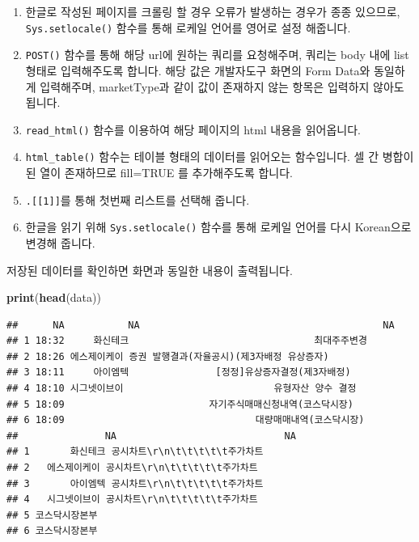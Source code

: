 \documentclass[]{book}
\newenvironment{Shaded}{\begin{snugshade}}{\end{snugshade}}
\newcommand{\KeywordTok}[1]{\textcolor[rgb]{0.13,0.29,0.53}{\textbf{#1}}}
\newcommand{\NormalTok}[1]{#1}
\providecommand{\tightlist}{%
  \setlength{\itemsep}{0pt}\setlength{\parskip}{0pt}}
\begin{document}
\begin{enumerate}
\def\labelenumi{\arabic{enumi}.}
\tightlist
\item
  한글로 작성된 페이지를 크롤링 할 경우 오류가 발생하는 경우가 종종 있으므로, \texttt{Sys.setlocale()} 함수를 통해 로케일 언어를 영어로 설정 해줍니다.
\item
  \texttt{POST()} 함수를 통해 해당 url에 원하는 쿼리를 요청해주며, 쿼리는 body 내에 list 형태로 입력해주도록 합니다. 해당 값은 개발자도구 화면의 Form Data와 동일하게 입력해주며, marketType과 같이 값이 존재하지 않는 항목은 입력하지 않아도 됩니다.
\item
  \texttt{read\_html()} 함수를 이용하여 해당 페이지의 html 내용을 읽어옵니다.
\item
  \texttt{html\_table()} 함수는 테이블 형태의 데이터를 읽어오는 함수입니다. 셀 간 병합이 된 열이 존재하므로 fill=TRUE 를 추가해주도록 합니다.
\item
  \texttt{.{[}{[}1{]}{]}}를 통해 첫번째 리스트를 선택해 줍니다.
\item
  한글을 읽기 위해 \texttt{Sys.setlocale()} 함수를 통해 로케일 언어를 다시 Korean으로 변경해 줍니다.
\end{enumerate}

저장된 데이터를 확인하면 화면과 동일한 내용이 출력됩니다.

\begin{Shaded}
\begin{Highlighting}[]
\KeywordTok{print}\NormalTok{(}\KeywordTok{head}\NormalTok{(data))}
\end{Highlighting}
\end{Shaded}

\begin{verbatim}
##      NA           NA                                          NA
## 1 18:32     화신테크                                최대주주변경
## 2 18:26 에스제이케이 증권 발행결과(자율공시)(제3자배정 유상증자)
## 3 18:11     아이엠텍               [정정]유상증자결정(제3자배정)
## 4 18:10 시그넷이브이                          유형자산 양수 결정
## 5 18:09                         자기주식매매신청내역(코스닥시장)
## 6 18:09                                 대량매매내역(코스닥시장)
##               NA                             NA
## 1       화신테크 공시차트\r\n\t\t\t\t\t주가차트
## 2   에스제이케이 공시차트\r\n\t\t\t\t\t주가차트
## 3       아이엠텍 공시차트\r\n\t\t\t\t\t주가차트
## 4   시그넷이브이 공시차트\r\n\t\t\t\t\t주가차트
## 5 코스닥시장본부                               
## 6 코스닥시장본부
\end{verbatim}
\end{document}
